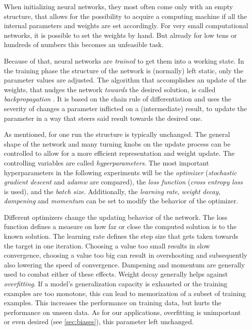 When initializing neural networks, they most often come only with an empty structure, that allows for the possibility to acquire a computing machine if all the internal parameters and weights are set accordingly.
For very small computational networks, it is possible to set the weights by hand.
But already for low tens or hundreds of numbers this becomes an unfeasible task. 

Because of that, neural networks are \emph{trained} to get them into a working state. In the training phase the structure of the network is (normally) left static, only the parameter values are adjusted. 
The algorithm that accomplishes an update of the weights, that nudges the network \emph{towards} the desired solution, is called \emph{backpropagation} \cite{machineLearningMitchell}.
It is based on the chain rule of differentiation and uses the severity of changes a parameter inflicted on a (intermediate) result, to update the parameter in a way that steers said result towards the desired one. 

As mentioned, for one run the structure is typically unchanged. 
The general shape of the network and many turning knobs on the update process can be controlled to allow for a more efficient representation and weight update.
The controlling variables are called \emph{hyperparameters}.
The most important hyperparameters in the following experiments will be the \emph{optimizer} (\emph{stochastic gradient descent} and \emph{adamw} \cite{adamwOptimizer} are compared), the \emph{loss function} (\emph{cross entropy loss} is used), and the \emph{batch size}. 
Additionally, the \emph{learning rate}, \emph{weight decay}, \emph{dampening} and \emph{momentum} can be set to modify the behavior of the optimizer.

Different optimizers change the updating behavior of the network. 
The loss function defines a measure on how far or close the computed solution is to the known solution.
The learning rate defines the step size that gets taken towards the target in one iteration.
Choosing a value too small results in slow convergence, choosing a value too big can result in overshooting and subsequently also lowering the speed of convergence.
Dampening and momentum are generally used to combat either of these effects.
Weight decay generally helps against \emph{overfitting}.
If a model's generalization capacity is exhausted or the training examples are too monotone, this can lead to memorization of a subset of training examples. This increases the performance on training data, but hurts the performance on unseen data. 
As for our applications, overfitting is unimportant or even desired (see \autoref{sec:biases}), this parameter left unchanged.

